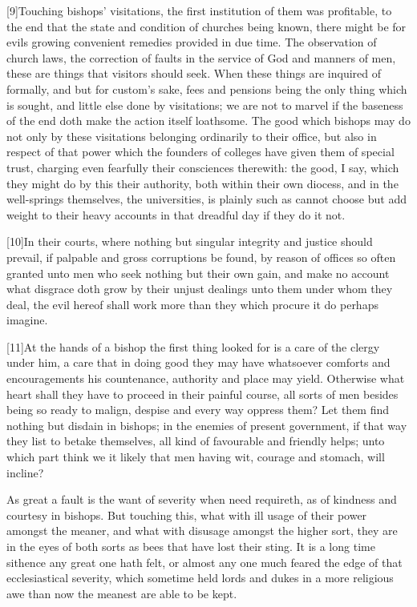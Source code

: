 [9]Touching bishops’ visitations, the first institution of them was profitable, to the end that the state and condition of churches being known, there might be for evils growing convenient remedies provided in due time. The observation of church laws, the correction of faults in the service of God and manners of men, these are things that visitors should seek. When these things are inquired of formally, and but for custom’s sake, fees and pensions being the only thing which is sought, and little else done by visitations; we are not to marvel if the baseness of the end doth make the action itself loathsome. The good which bishops may do not only by these visitations belonging ordinarily to their office, but also in respect of that power which the founders of colleges have given them of special trust, charging even fearfully their consciences therewith: the good, I say, which they might do by this their authority, both within their own diocess, and in the well-springs themselves, the universities, is plainly such as cannot choose but add weight to their heavy accounts in that dreadful day if they do it not.

[10]In their courts, where nothing but singular integrity and justice should prevail, if palpable and gross corruptions be found, by reason of offices so often granted unto men who seek nothing but their own gain, and make no account what disgrace doth grow by their unjust dealings unto them under  whom they deal, the evil hereof shall work more than they which procure it do perhaps imagine.

[11]At the hands of a bishop the first thing looked for is a care of the clergy under him, a care that in doing good they may have whatsoever comforts and encouragements his countenance, authority and place may yield. Otherwise what heart shall they have to proceed in their painful course, all sorts of men besides being so ready to malign, despise and every way oppress them? Let them find nothing but disdain in bishops; in the enemies of present government, if that way they list to betake themselves, all kind of favourable and friendly helps; unto which part think we it likely that men having wit, courage and stomach, will incline?

As great a fault is the want of severity when need requireth, as of kindness and courtesy in bishops. But touching this, what with ill usage of their power amongst the meaner, and what with disusage amongst the higher sort, they are in the eyes of both sorts as bees that have lost their sting. It is a long time sithence any great one hath felt, or almost any one much feared the edge of that ecclesiastical severity, which sometime held lords and dukes in a more religious awe than now the meanest are able to be kept.

